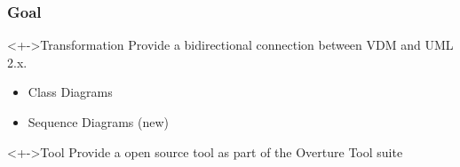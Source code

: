 %
%
\frame
{
  \frametitle{Goal}

\begin{center}

	\begin{block}<+->{Transformation}
	Provide a bidirectional connection between VDM and UML 2.x. 
	\begin{itemize}
		\item Class Diagrams
		\item Sequence Diagrams (new)
	\end{itemize}
	\end{block}
\vspace{1cm}
	\begin{block}<+->{Tool}
	Provide a open source tool as part of the Overture Tool suite
	\end{block}
%	  	
\end{center}
}


